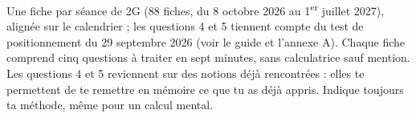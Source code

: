 \begin{note}
\ifmxteacher
  Une fiche par séance de 2G (88 fiches, du 8 octobre 2026 au 1\textsuperscript{er} juillet 2027), alignée sur le calendrier ;
  les questions 4 et 5 tiennent compte du test de positionnement du 29 septembre 2026 (voir le guide et l'annexe A).
\else
  Chaque fiche comprend cinq questions à traiter en sept minutes, sans calculatrice sauf mention.
  Les questions 4 et 5 reviennent sur des notions déjà rencontrées : elles te permettent de te remettre en mémoire ce que tu as déjà appris.
  Indique toujours ta méthode, même pour un calcul mental.
\fi
\end{note}
\tableofcontents
\bigskip
